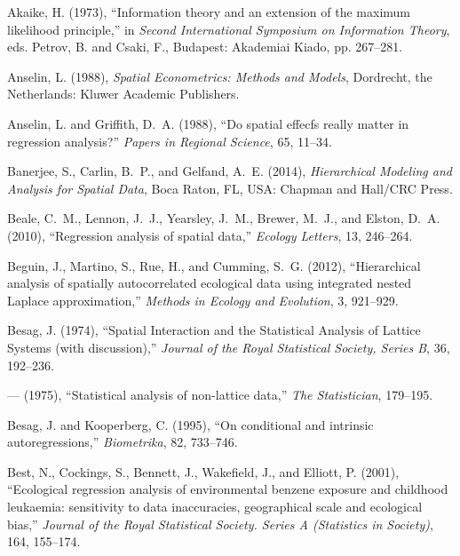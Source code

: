 \documentclass[11pt, titlepage]{article}\usepackage[]{graphicx}\usepackage[]{color}
\begin{document}
\begin{spacing}{1.9}
\begin{flushleft}
\begin{thebibliography}{126}
Akaike, H. (1973), \enquote{Information theory and an extension of the maximum
  likelihood principle,} in \textit{Second International Symposium on
  Information Theory}, eds. Petrov, B. and Csaki, F., Budapest: Akademiai
  Kiado, pp. 267--281.

Anselin, L. (1988), \textit{Spatial Econometrics: Methods and Models},
  Dordrecht, the Netherlands: Kluwer Academic Publishers.

Anselin, L. and Griffith, D.~A. (1988), \enquote{Do spatial effecfs really
  matter in regression analysis?} \textit{Papers in Regional Science}, 65,
  11--34.

Banerjee, S., Carlin, B.~P., and Gelfand, A.~E. (2014), \textit{Hierarchical
  Modeling and Analysis for Spatial Data}, Boca Raton, FL, USA: Chapman and
  Hall/CRC Press.

Beale, C.~M., Lennon, J.~J., Yearsley, J.~M., Brewer, M.~J., and Elston, D.~A.
  (2010), \enquote{Regression analysis of spatial data,} \textit{Ecology
  Letters}, 13, 246--264.

Beguin, J., Martino, S., Rue, H., and Cumming, S.~G. (2012),
  \enquote{Hierarchical analysis of spatially autocorrelated ecological data
  using integrated nested Laplace approximation,} \textit{Methods in Ecology
  and Evolution}, 3, 921--929.

Besag, J. (1974), \enquote{Spatial Interaction and the Statistical Analysis of
  Lattice Systems (with discussion),} \textit{Journal of the Royal Statistical
  Society, Series B}, 36, 192--236.

--- (1975), \enquote{Statistical analysis of non-lattice data,} \textit{The
  Statistician}, 179--195.

Besag, J. and Kooperberg, C. (1995), \enquote{On conditional and intrinsic
  autoregressions,} \textit{Biometrika}, 82, 733--746.

Best, N., Cockings, S., Bennett, J., Wakefield, J., and Elliott, P. (2001),
  \enquote{Ecological regression analysis of environmental benzene exposure and
  childhood leukaemia: sensitivity to data inaccuracies, geographical scale and
  ecological bias,} \textit{Journal of the Royal Statistical Society. Series A
  (Statistics in Society)}, 164, 155--174.


\end{thebibliography}
\end{flushleft}
\end{spacing}
\end{document}
